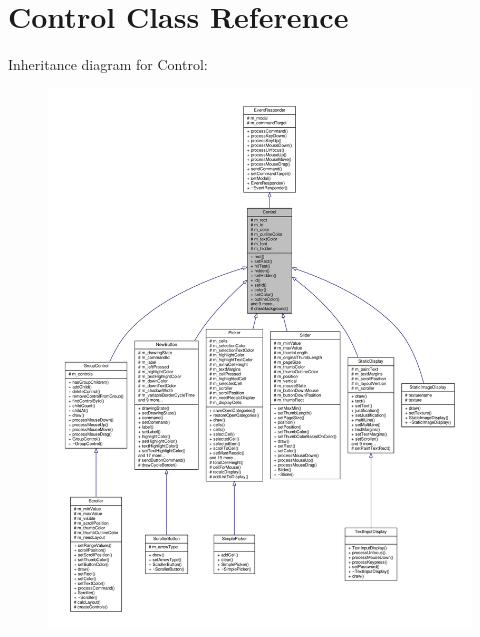 \hypertarget{classControl}{}\section{Control Class Reference}
\label{classControl}


Inheritance diagram for Control\+:
\nopagebreak
\begin{figure}[H]
\begin{center}
\leavevmode
\includegraphics[width=350pt]{d4/d45/classControl__inherit__graph}
\end{center}
\end{figure}


